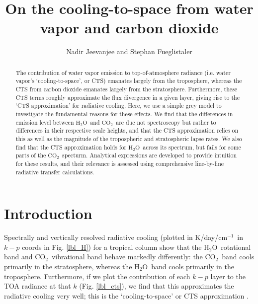 \documentclass[10pt]{article}
\newcommand{\cotwo}{\ensuremath{\mathrm{CO_2}}}
\newcommand{\htwo}{\ensuremath{\mathrm{H_2O}}}
\newcommand{\cminverse}{\ensuremath{\mathrm{cm^{-1}}}}
\begin{document}
%
%


\title{On the cooling-to-space from water vapor and carbon dioxide}

%
%


 \author{Nadir Jeevanjee and Stephan Fueglistaler}

\maketitle

\begin{abstract}
The contribution of water vapor emission to  top-of-atmosphere radiance (i.e. water vapor's `cooling-to-space', or CTS) emanates largely from the troposphere, whereas the CTS from carbon dioxide emanates largely from the stratosphere. Furthermore, these CTS terms  roughly approximate the flux divergence in a given layer, giving rise to the `CTS approximation' for radiative cooling. Here, we use  a simple grey model to investigate the fundamental reasons for these effects. We find that the differences in emission level between \htwo\ and \cotwo\ are due not spectroscopy but rather to differences in their respective scale heights, and that the CTS approximation relies on this as well as the magnitude of the tropospheric and stratospheric lapse rates. We also find that the CTS approximation holds for \htwo\ across its spectrum, but fails for some parts of the \cotwo\ specturm.  Analytical expressions are developed to provide intuition for these results, and their relevance  is assessed using comprehensive  line-by-line radiative transfer  calculations.


%
%
\end{abstract}


%
%


\section {Introduction}
Spectrally and vertically resolved radiative cooling (plotted in K/day/\cminverse\ in $k-p$ coords in Fig. \ref{lbl_H}) for a tropical column show that the \htwo\ rotational band and \cotwo\  vibrational band behave markedly differently: the \cotwo\ band cools primarily in the stratosphere, whereas the \htwo\ band cools primarily in the troposphere. Furthermore, if we plot the contribution of each $k-p$ layer to the TOA radiance at that $k$ (Fig. \ref{lbl_cts}), we find that this approximates the radiative cooling very well; this is the `cooling-to-space' or CTS approximation \citep{rodgers1966, clough1992,thomas2002}.
\end{document}
